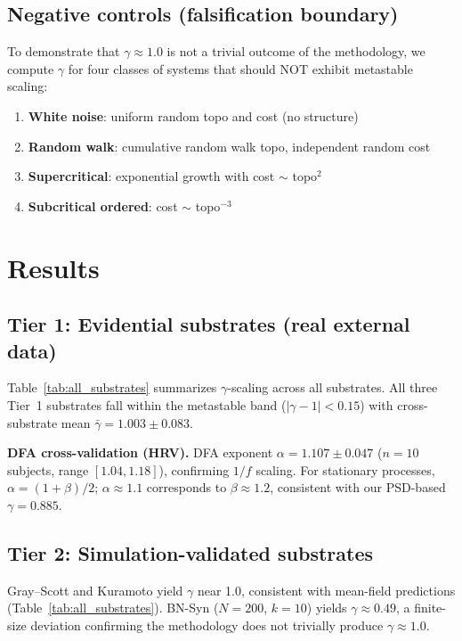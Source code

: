 \documentclass[11pt,a4paper,twocolumn]{article}
\begin{document}
\subsection{Negative controls (falsification boundary)}

To demonstrate that $\gamma \approx 1.0$ is not a trivial outcome of the methodology, we compute $\gamma$ for four classes of systems that should NOT exhibit metastable scaling:
\begin{enumerate}
\item \textbf{White noise}: uniform random topo and cost (no structure)
\item \textbf{Random walk}: cumulative random walk topo, independent random cost
\item \textbf{Supercritical}: exponential growth with cost $\sim$ topo$^2$
\item \textbf{Subcritical ordered}: cost $\sim$ topo$^{-3}$
\end{enumerate}

\section{Results}

\subsection{Tier 1: Evidential substrates (real external data)}

Table~\ref{tab:all_substrates} summarizes $\gamma$-scaling across all substrates. All three Tier~1 substrates fall within the metastable band ($|\gamma - 1| < 0.15$) with cross-substrate mean $\bar{\gamma} = 1.003 \pm 0.083$.

\textbf{DFA cross-validation (HRV).} DFA exponent $\alpha = 1.107 \pm 0.047$ ($n = 10$ subjects, range $[1.04, 1.18]$), confirming $1/f$ scaling. For stationary processes, $\alpha = (1 + \beta)/2$; $\alpha \approx 1.1$ corresponds to $\beta \approx 1.2$, consistent with our PSD-based $\gamma = 0.885$.

\subsection{Tier 2: Simulation-validated substrates}

Gray--Scott and Kuramoto yield $\gamma$ near 1.0, consistent with mean-field predictions (Table~\ref{tab:all_substrates}). BN-Syn ($N\!=\!200$, $k\!=\!10$) yields $\gamma \approx 0.49$, a finite-size deviation confirming the methodology does not trivially produce $\gamma \approx 1.0$.
\end{document}
